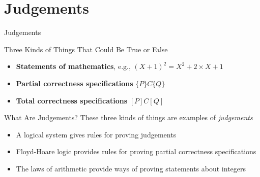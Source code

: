 \section{Judgements}

\begin{frame}{Judgements}
    \begin{block}{Three Kinds of Things That Could Be True or False}
        \begin{itemize}
            \item \textbf{Statements of mathematics}, e.g., $(X + 1)^2 = X^2 + 2 \times X + 1$
            \item \textbf{Partial correctness specifications} $\{P\} C \{Q\}$
            \item \textbf{Total correctness specifications} $[P] C [Q]$
        \end{itemize}
    \end{block}
    
    \begin{block}{What Are Judgements?}
        These three kinds of things are examples of \emph{judgements}
        \begin{itemize}
            \item A logical system gives rules for proving judgements
            \item Floyd-Hoare logic provides rules for proving partial correctness specifications
            \item The laws of arithmetic provide ways of proving statements about integers
        \end{itemize}
    \end{block}
\end{frame}

